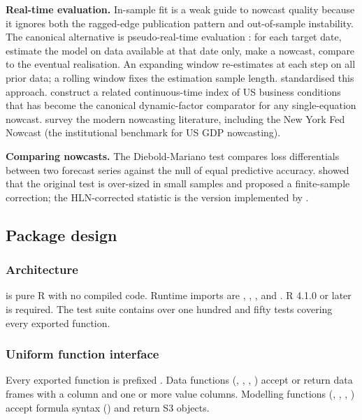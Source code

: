 \textbf{Real-time evaluation.} In-sample fit is a weak guide to nowcast
quality because it ignores both the ragged-edge publication pattern and
out-of-sample instability. The canonical alternative is pseudo-real-time
evaluation \citep{stark2002database}: for each target date, estimate the
model on data available at that date only, make a nowcast, compare to
the eventual realisation. An expanding window re-estimates at each step
on all prior data; a rolling window fixes the estimation sample length.
\citet{giannone2008nowcasting} standardised this approach.
\citet{aruoba2009real} construct a related continuous-time index of US
business conditions that has become the canonical dynamic-factor
comparator for any single-equation nowcast. \citet{bok2018macroeconomic}
survey the modern nowcasting literature, including the New York Fed
Nowcast (the institutional benchmark for US GDP nowcasting).

\textbf{Comparing nowcasts.} The Diebold-Mariano test
\citep{diebold1995comparing} compares loss differentials between two
forecast series against the null of equal predictive accuracy.
\citet{harvey1997testing} showed that the original test is over-sized in
small samples and proposed a finite-sample correction; the HLN-corrected
statistic is the version implemented by .

\subsection{Package design}\label{package-design}

\subsubsection{Architecture}\label{architecture}

 is pure R with no compiled code. Runtime imports are
, , , and . R
4.1.0 or later is required. The test suite contains over one hundred and
fifty tests covering every exported function.

\subsubsection{Uniform function
interface}\label{uniform-function-interface}

Every exported function is prefixed . Data functions
(, , ,
) accept or return data frames with a 
column and one or more value columns. Modelling functions
(, , ,
) accept formula syntax
() and return S3 objects.

